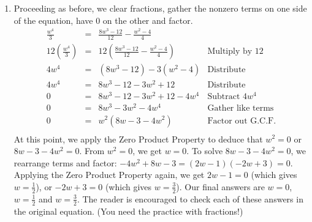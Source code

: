 \documentclass{ximera}
\begin{document}
\begin{example}
\begin{explanation}
\begin{enumerate}
\[\begin{array}{rclr}
\frac{(y-1)^2}{(y-1)} & = & \frac{2(y-1)}{(y-1)} & \text{Divide by $(y-1)$ - this assumes $(y-1) \neq 0$}\\
y - 1 & = & 2 & \\
y & = & 3 & \\  \end{array} \] Note that in this approach, we obtain the $y=3$ solution, but we `lose' the $y = 1$ solution. How did that happen?  Assuming $y - 1 \neq 0$ is equivalent to assuming $y \neq 1$.  This is an issue because $y = 1$ is a solution to the original equation and it was `divided out' too early.  The moral of the story?  If you decide to divide by a variable expression, double check that you aren't excluding any solutions.\footnote{You will see other examples throughout this text where dividing by a variable quantity does more harm than good.  Keep this basic one in mind as you move on in your studies - it's a good cautionary tale.}

\item Proceeding as before, we clear fractions, gather the nonzero terms on one side of the equation, have $0$ on the other and factor.\[ \begin{array}{rclr}

\frac{w^4}{3} & = & \frac{8w^3-12}{12} - \frac{w^2-4}{4} & \\ [5pt]

12 \left(\frac{w^4}{3}\right) & = & 12 \left(\frac{8w^3-12}{12} - \frac{w^2-4}{4} \right) & \text{Multiply by $12$}\\[8pt]

4w^4 & = & (8w^3 - 12) - 3(w^2-4) & \text{Distribute} \\
4w^4 & = & 8w^3 - 12 - 3w^2 + 12 & \text{Distribute} \\

0 & = & 8w^3 - 12 - 3w^2 + 12  - 4w^4 & \text{Subtract $4w^4$} \\
0 & = & 8w^3  - 3w^2 - 4w^4 & \text{Gather like terms} \\
0 & = & w^2(8w - 3 - 4w^2) & \text{Factor out G.C.F.} \\ \end{array} \] At this point, we  apply the Zero Product Property to deduce that $w^2 = 0$ or $8w - 3 - 4w^2 = 0$. From $w^2 = 0$, we get $w = 0$. To solve $8w - 3 - 4w^2 = 0$, we rearrange terms and factor:  $-4w^2 + 8w - 3= (2w - 1)(-2w+3) = 0$.  Applying the Zero Product Property again, we get $2w - 1= 0$ (which gives $w = \frac{1}{2}$), or $-2w+3 = 0$ (which gives $w = \frac{3}{2}$).  Our final answers are $w = 0$, $w = \frac{1}{2}$ and $w = \frac{3}{2}$.  The reader is encouraged to check each of these answers in the original equation.  (You need the practice with fractions!)


\end{enumerate}
\end{explanation}
\end{example}
\end{document}
